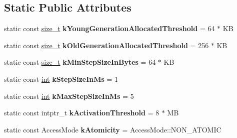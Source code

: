 \subsection*{Static Public Attributes}
\begin{DoxyCompactItemize}
\item 
\mbox{\label{classv8_1_1internal_1_1IncrementalMarking_ace875d8d2039d97004fe4c47edabcf3f}} 
static const \mbox{\hyperlink{classsize__t}{size\+\_\+t}} {\bfseries k\+Young\+Generation\+Allocated\+Threshold} = 64 $\ast$ KB
\item 
\mbox{\label{classv8_1_1internal_1_1IncrementalMarking_ab87d8f29b713dd5fe621bdd9fc10e20a}} 
static const \mbox{\hyperlink{classsize__t}{size\+\_\+t}} {\bfseries k\+Old\+Generation\+Allocated\+Threshold} = 256 $\ast$ KB
\item 
\mbox{\label{classv8_1_1internal_1_1IncrementalMarking_ae09aaa65c364184364419877506e6ada}} 
static const \mbox{\hyperlink{classsize__t}{size\+\_\+t}} {\bfseries k\+Min\+Step\+Size\+In\+Bytes} = 64 $\ast$ KB
\item 
\mbox{\label{classv8_1_1internal_1_1IncrementalMarking_a9ea4fcb1de44e94f8c3ff7417e64a4e0}} 
static const \mbox{\hyperlink{classint}{int}} {\bfseries k\+Step\+Size\+In\+Ms} = 1
\item 
\mbox{\label{classv8_1_1internal_1_1IncrementalMarking_ab827812b734b8536cdefc71a19897b96}} 
static const \mbox{\hyperlink{classint}{int}} {\bfseries k\+Max\+Step\+Size\+In\+Ms} = 5
\item 
\mbox{\label{classv8_1_1internal_1_1IncrementalMarking_ad37fd448b492d2b8010e27f1778ec490}} 
static const intptr\+\_\+t {\bfseries k\+Activation\+Threshold} = 8 $\ast$ MB
\item 
\mbox{\label{classv8_1_1internal_1_1IncrementalMarking_aa340fe80000844647a0bb6dc9cc237f9}} 
static const Access\+Mode {\bfseries k\+Atomicity} = Access\+Mode\+::\+N\+O\+N\+\_\+\+A\+T\+O\+M\+IC
\end{DoxyCompactItemize}


